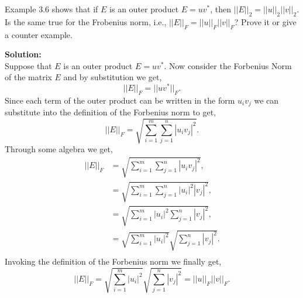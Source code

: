 \documentclass[12pt]{article}
\makeatletter
\theoremstyle{homework}
\newenvironment{exercise}[1]
{\def\@currentlabel{#1}\exercisecore}
{\endexercisecore}
\newcommand{\localhead}[1]{\par\smallskip\noindent\textbf{#1}\nobreak\\}%
\newcommand\solution{\localhead{Solution:}}
\makeatother
\begin{document}
\begin{exercise}{3.4} Example 3.6 shows that if $E$ is an outer product $E = uv^*$, then $||E||_2 = ||u||_2||v||_2$.
  Is the same true for the Frobenius norm, i.e., $||E||_F = ||u||_F||v||_F$? Prove it or give a counter example.\\
  \solution Suppose that  $E$ is an outer product $E = uv^*$. Now consider the Forbenius Norm of the matrix $E$ and by substitution we
  get, 
  \begin{equation*}
    ||E||_F = ||uv^*||_F.
  \end{equation*}
  Since each term of the outer product can be written in the form $u_iv_j$ we can substitute into the definition of the Forbenius norm to get, 
  \begin{equation*}
    ||E||_F = \sqrt{\sum_{i = 1}^m \sum_{j = 1}^n |u_iv_j|^2}.
  \end{equation*}
  Through some algebra we get, 
  \begin{align*}
    ||E||_F &= \sqrt{\sum_{i = 1}^m \sum_{j = 1}^n |u_iv_j|^2},\\
            &= \sqrt{\sum_{i = 1}^m \sum_{j = 1}^n |u_i|^2|v_j|^2},\\
            &= \sqrt{\sum_{i = 1}^m |u_i|^2 \sum_{j = 1}^n|v_j|^2},\\
            &= \sqrt{\sum_{i = 1}^m |u_i|^2} \sqrt{\sum_{j = 1}^n|v_j|^2}.\\
  \end{align*}
  Invoking the definition of the Forbenius norm we finally get,
  \begin{equation*}
    ||E||_F =  \sqrt{\sum_{i = 1}^m |u_i|^2} \sqrt{\sum_{j = 1}^n|v_j|^2} = ||u||_F||v||_F.
  \end{equation*}
\end{exercise}
\vspace{1in}
\end{document}
